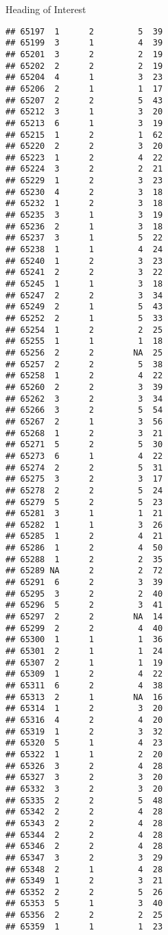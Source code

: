 \documentclass[
  ignorenonframetext,
]{beamer}
\begin{document}
\begin{frame}[fragile]{Heading of Interest}
\begin{verbatim}
## 65197  1      2         5  39
## 65199  3      1         4  39
## 65201  3      2         2  19
## 65202  2      2         2  19
## 65204  4      1         3  23
## 65206  2      1         1  17
## 65207  2      2         5  43
## 65212  3      1         3  20
## 65213  6      1         3  19
## 65215  1      2         1  62
## 65220  2      2         3  20
## 65223  1      2         4  22
## 65224  3      2         2  21
## 65229  1      2         3  23
## 65230  4      2         3  18
## 65232  1      2         3  18
## 65235  3      1         3  19
## 65236  2      1         3  18
## 65237  3      1         5  22
## 65238  1      1         4  24
## 65240  1      2         3  23
## 65241  2      2         3  22
## 65245  1      1         3  18
## 65247  2      2         3  34
## 65249  2      1         5  43
## 65252  2      1         5  33
## 65254  1      2         2  25
## 65255  1      1         1  18
## 65256  2      2        NA  25
## 65257  2      2         5  38
## 65258  1      2         4  22
## 65260  2      2         3  39
## 65262  3      2         3  34
## 65266  3      2         5  54
## 65267  2      1         3  56
## 65268  1      2         3  21
## 65271  5      2         5  30
## 65273  6      1         4  22
## 65274  2      2         5  31
## 65275  3      2         3  17
## 65278  2      2         5  24
## 65279  5      2         5  23
## 65281  3      1         1  21
## 65282  1      1         3  26
## 65285  1      2         4  21
## 65286  1      2         4  50
## 65288  1      2         2  35
## 65289 NA      2         2  72
## 65291  6      2         3  39
## 65295  3      2         2  40
## 65296  5      2         3  41
## 65297  2      2        NA  14
## 65299  2      2         4  40
## 65300  1      1         1  36
## 65301  2      1         1  24
## 65307  2      1         1  19
## 65309  1      2         4  22
## 65311  6      2         4  38
## 65313  2      1        NA  16
## 65314  1      2         3  20
## 65316  4      2         4  20
## 65319  1      2         3  32
## 65320  5      1         4  23
## 65322  1      1         2  20
## 65326  3      2         4  28
## 65327  3      2         3  20
## 65332  3      2         3  20
## 65335  2      2         5  48
## 65342  2      2         4  28
## 65343  2      2         4  28
## 65344  2      2         4  28
## 65346  2      2         4  28
## 65347  3      2         3  29
## 65348  2      1         4  28
## 65349  1      2         3  21
## 65352  2      2         5  26
## 65353  5      1         3  40
## 65356  2      2         2  25
## 65359  1      1         1  23

\end{verbatim}
\end{frame}
\end{document}
